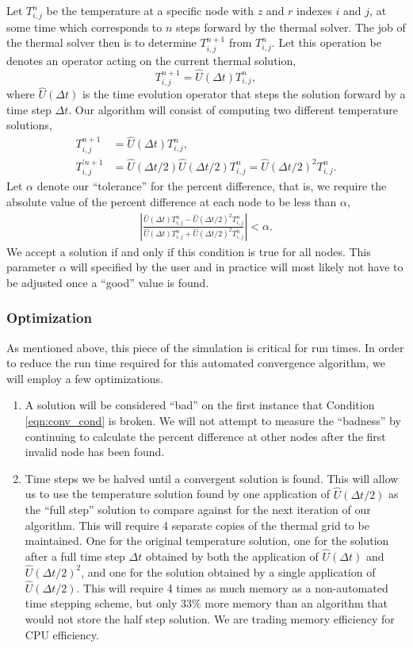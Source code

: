 \documentclass[letterpaper]{report}
\begin{document}
Let $T_{i,j}^{n}$ be the temperature at a specific node with $z$ and $r$ indexes $i$ and $j$, at some time which corresponds to $n$ steps forward by
the thermal solver.  The job of the thermal solver then is to determine $T_{i,j}^{n+1}$ from $T_{i,j}^{n}$. Let this operation be denotes an operator
acting on the current thermal solution,
$$
T_{i,j}^{n+1} = \hat{U}(\Delta t)T_{i,j}^{n},
$$
where $\hat{U}(\Delta t)$ is the time evolution operator that steps the solution forward by a time step $\Delta t$.
Our algorithm will consist of computing two different temperature solutions,
\begin{align*}
T_{i,j}^{n+1} &= \hat{U}(\Delta t)T_{i,j}^{n}, \\
T_{i,j}^{\prime n+1} &= \hat{U}(\Delta t/2)\hat{U}(\Delta t/2)T_{i,j}^{n} =\hat{U}(\Delta t/2)^2T_{i,j}^{n}.
\end{align*}
Let $\alpha$ denote our ``tolerance'' for the percent difference, that is, we require the absolute value of the percent difference at each node to be
less than $\alpha$,
\begin{align}
  \label{eqn:conv_cond}
\left|\frac{ \hat{U}(\Delta t)T_{i,j}^{n} - \hat{U}(\Delta t/2)^2T_{i,j}^{n} }
           { \hat{U}(\Delta t)T_{i,j}^{n} + \hat{U}(\Delta t/2)^2T_{i,j}^{n} } \right| < \alpha.
\end{align}
We accept a solution if and only if this condition is true for all nodes. This parameter $\alpha$ will specified by the user and in practice will most
likely not have to be adjusted once a ``good'' value is found.

\subsubsection{Optimization}
As mentioned above, this piece of the simulation is critical for run times. In order to reduce the run time required for this automated convergence
algorithm, we will employ a few optimizations.
\begin{enumerate}
    \item A solution will be considered ``bad'' on the first instance that Condition \ref{eqn:conv_cond} is broken. We will not attempt to measure the
      ``badness'' by continuing to calculate the percent difference at other nodes after the first invalid node has been found.
    \item Time steps we be halved until a convergent solution is found. This will allow us to use the temperature solution found by one application of
      $\hat{U}(\Delta t / 2)$ as the ``full step'' solution to compare against for the next iteration of our algorithm. This will require 4 separate
      copies of the thermal grid to be maintained. One for the original temperature solution, one for the solution after a full time step $\Delta t$
      obtained by both the application of $\hat{U}(\Delta t)$ and $\hat{U}(\Delta t/2)^2$, and one for the solution obtained by a single application
      of $\hat{U}(\Delta t / 2)$. This will require 4 times as much memory as a non-automated time stepping scheme, but only $33\%$ more memory than
      an algorithm that would not store the half step solution. We are trading memory efficiency for CPU efficiency.
\end{enumerate}
\end{document}
